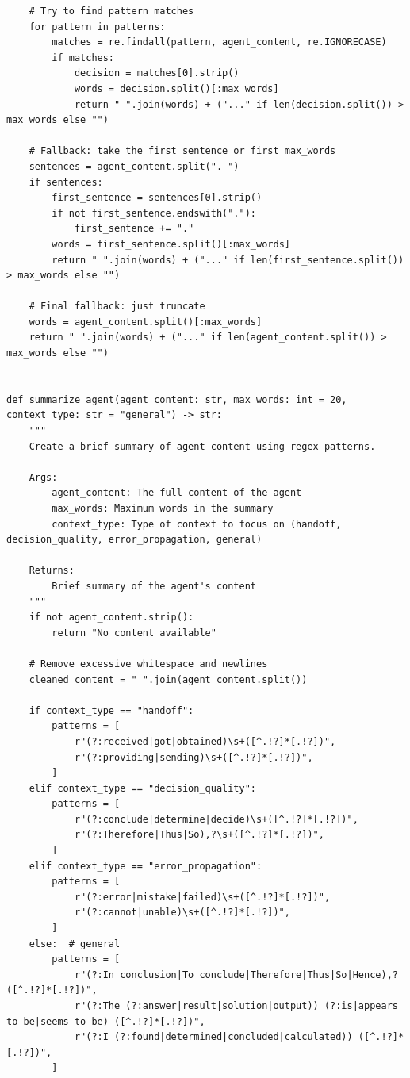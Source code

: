 \documentclass{article}
\begin{document}
\begin{lstlisting}
    # Try to find pattern matches
    for pattern in patterns:
        matches = re.findall(pattern, agent_content, re.IGNORECASE)
        if matches:
            decision = matches[0].strip()
            words = decision.split()[:max_words]
            return " ".join(words) + ("..." if len(decision.split()) > max_words else "")

    # Fallback: take the first sentence or first max_words
    sentences = agent_content.split(". ")
    if sentences:
        first_sentence = sentences[0].strip()
        if not first_sentence.endswith("."):
            first_sentence += "."
        words = first_sentence.split()[:max_words]
        return " ".join(words) + ("..." if len(first_sentence.split()) > max_words else "")

    # Final fallback: just truncate
    words = agent_content.split()[:max_words]
    return " ".join(words) + ("..." if len(agent_content.split()) > max_words else "")


def summarize_agent(agent_content: str, max_words: int = 20, context_type: str = "general") -> str:
    """
    Create a brief summary of agent content using regex patterns.

    Args:
        agent_content: The full content of the agent
        max_words: Maximum words in the summary
        context_type: Type of context to focus on (handoff, decision_quality, error_propagation, general)

    Returns:
        Brief summary of the agent's content
    """
    if not agent_content.strip():
        return "No content available"

    # Remove excessive whitespace and newlines
    cleaned_content = " ".join(agent_content.split())

    if context_type == "handoff":
        patterns = [
            r"(?:received|got|obtained)\s+([^.!?]*[.!?])",
            r"(?:providing|sending)\s+([^.!?]*[.!?])",
        ]
    elif context_type == "decision_quality":
        patterns = [
            r"(?:conclude|determine|decide)\s+([^.!?]*[.!?])",
            r"(?:Therefore|Thus|So),?\s+([^.!?]*[.!?])",
        ]
    elif context_type == "error_propagation":
        patterns = [
            r"(?:error|mistake|failed)\s+([^.!?]*[.!?])",
            r"(?:cannot|unable)\s+([^.!?]*[.!?])",
        ]
    else:  # general
        patterns = [
            r"(?:In conclusion|To conclude|Therefore|Thus|So|Hence),? ([^.!?]*[.!?])",
            r"(?:The (?:answer|result|solution|output)) (?:is|appears to be|seems to be) ([^.!?]*[.!?])",
            r"(?:I (?:found|determined|concluded|calculated)) ([^.!?]*[.!?])",
        ]


\end{lstlisting}
\end{document}
